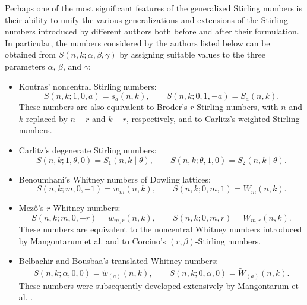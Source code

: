 \documentclass[12pt]{article}
\begin{document}
Perhaps one of the most significant features of the generalized Stirling numbers is their ability to unify the various generalizations and extensions of the Stirling numbers introduced by different authors both before and after their formulation. In particular, the numbers considered by the authors listed below can be obtained from $S(n,k;\alpha,\beta,\gamma)$ by assigning suitable values to the three parameters $\alpha$, $\beta$, and $\gamma$:

\begin{itemize}
	\item Koutras' \cite{Kout} noncentral Stirling numbers:
	$$ S(n,k;1,0,a)=s_a(n,k),\qquad	S(n,k;0,1,-a)=S_a(n,k).$$
	These numbers are also equivalent to Broder's \cite{Bro} $r$-Stirling numbers, with $n$ and $k$ replaced by $n-r$ and $k-r$, respectively, and to Carlitz's \cite{Car2} weighted Stirling numbers.
	
	\item Carlitz's \cite{Car1} degenerate Stirling numbers:
	$$ S(n,k;1,\theta,0)=S_1(n,k\mid\theta),\qquad S(n,k;\theta,1,0)=S_2(n,k\mid\theta).$$
	
	\item Benoumhani's \cite{Ben1,Ben2} Whitney numbers of Dowling lattices:
	$$ S(n,k;m,0,-1)=w_m(n,k),\qquad S(n,k;0,m,1)=W_m(n,k).$$
		
	\item Mez\H{o}'s \cite{Mez1} $r$-Whitney numbers:
	$$ S(n,k;m,0,-r)=w_{m,r}(n,k),\qquad S(n,k;0,m,r)=W_{m,r}(n,k).$$
	These numbers are equivalent to the noncentral Whitney numbers introduced by Mangontarum et al. \cite{Mangontarum5} and to Corcino's \cite{Corcino1} $(r,\beta)$-Stirling numbers.
	
	\item Belbachir and Bousbaa's \cite{Bel} translated Whitney numbers:
	$$ S(n,k;\alpha,0,0)=\widetilde{w}_{(a)}(n,k),\qquad S(n,k;0,\alpha,0)=\widetilde{W}_{(a)}(n,k).$$
	These numbers were subsequently developed extensively by Mangontarum et al. \cite{Mangontarum,Mangontarum3,Mangontarum4}.
\end{itemize}
\end{document}
